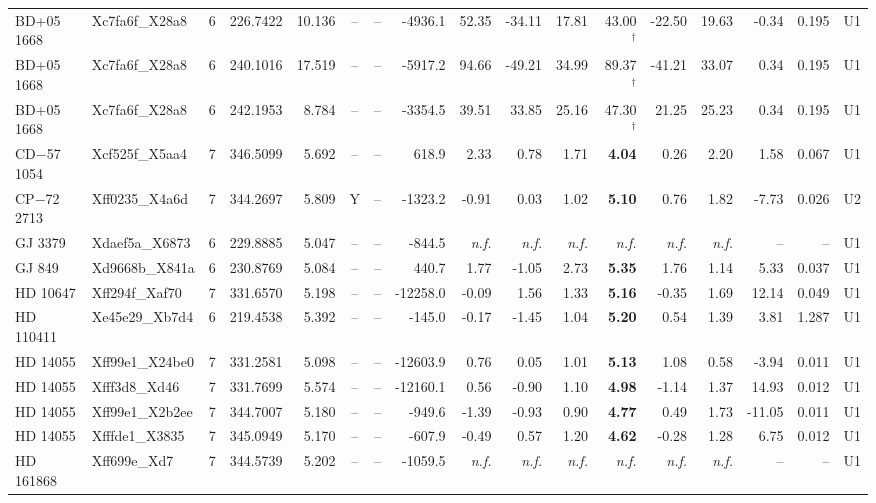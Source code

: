 \begin{tabular}{@{}l@{~}l@{~}c@{~}r@{~}r@{~}c@{~}l@{~}r@{~~}r@{~}r@{~}r@{~~}r@{~}r@{~}r@{~~}r@{~}r@{~}l@{}}
BD+05 1668 & Xc7fa6f\_X28a8 & 6 & 226.7422 & 10.136 & -- & -- & -4936.1 & 52.35 & -34.11 & 17.81 & 43.00$^{\dagger}$ & -22.50 & 19.63 & -0.34 & 0.195 & U1 \\
BD+05 1668 & Xc7fa6f\_X28a8 & 6 & 240.1016 & 17.519 & -- & -- & -5917.2 & 94.66 & -49.21 & 34.99 & 89.37$^{\dagger}$ & -41.21 & 33.07 & 0.34 & 0.195 & U1 \\
BD+05 1668 & Xc7fa6f\_X28a8 & 6 & 242.1953 & 8.784 & -- & -- & -3354.5 & 39.51 & 33.85 & 25.16 & 47.30$^{\dagger}$ & 21.25 & 25.23 & 0.34 & 0.195 & U1 \\
CD$-$57 1054 & Xcf525f\_X5aa4 & 7 & 346.5099 & 5.692 & -- & -- & 618.9 & 2.33 & 0.78 & 1.71 & \textbf{4.04} & 0.26 & 2.20 & 1.58 & 0.067 & U1 \\
CP$-$72 2713 & Xff0235\_X4a6d & 7 & 344.2697 & 5.809 & Y & -- & -1323.2 & -0.91 & 0.03 & 1.02 & \textbf{5.10} & 0.76 & 1.82 & -7.73 & 0.026 & U2 \\
GJ 3379 & Xdaef5a\_X6873 & 6 & 229.8885 & 5.047 & -- & -- & -844.5 & \emph{n.f.} & \emph{n.f.} & \emph{n.f.} & \emph{n.f.} & \emph{n.f.} & \emph{n.f.} & -- & -- & U1 \\
GJ 849 & Xd9668b\_X841a & 6 & 230.8769 & 5.084 & -- & -- & 440.7 & 1.77 & -1.05 & 2.73 & \textbf{5.35} & 1.76 & 1.14 & 5.33 & 0.037 & U1 \\
HD 10647 & Xff294f\_Xaf70 & 7 & 331.6570 & 5.198 & -- & -- & -12258.0 & -0.09 & 1.56 & 1.33 & \textbf{5.16} & -0.35 & 1.69 & 12.14 & 0.049 & U1 \\
HD 110411 & Xe45e29\_Xb7d4 & 6 & 219.4538 & 5.392 & -- & -- & -145.0 & -0.17 & -1.45 & 1.04 & \textbf{5.20} & 0.54 & 1.39 & 3.81 & 1.287 & U1 \\
HD 14055 & Xff99e1\_X24be0 & 7 & 331.2581 & 5.098 & -- & -- & -12603.9 & 0.76 & 0.05 & 1.01 & \textbf{5.13} & 1.08 & 0.58 & -3.94 & 0.011 & U1 \\
HD 14055 & Xfff3d8\_Xd46 & 7 & 331.7699 & 5.574 & -- & -- & -12160.1 & 0.56 & -0.90 & 1.10 & \textbf{4.98} & -1.14 & 1.37 & 14.93 & 0.012 & U1 \\
HD 14055 & Xff99e1\_X2b2ee & 7 & 344.7007 & 5.180 & -- & -- & -949.6 & -1.39 & -0.93 & 0.90 & \textbf{4.77} & 0.49 & 1.73 & -11.05 & 0.011 & U1 \\
HD 14055 & Xfffde1\_X3835 & 7 & 345.0949 & 5.170 & -- & -- & -607.9 & -0.49 & 0.57 & 1.20 & \textbf{4.62} & -0.28 & 1.28 & 6.75 & 0.012 & U1 \\
HD 161868 & Xff699e\_Xd7 & 7 & 344.5739 & 5.202 & -- & -- & -1059.5 & \emph{n.f.} & \emph{n.f.} & \emph{n.f.} & \emph{n.f.} & \emph{n.f.} & \emph{n.f.} & -- & -- & U1 \\

\end{tabular}
